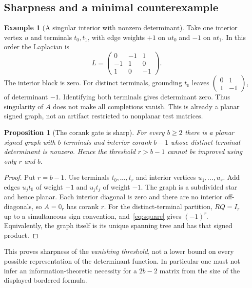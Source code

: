 \documentclass[11pt]{article}
\newtheorem{proposition}[theorem]{Proposition}
\theoremstyle{definition}
\newtheorem{example}[theorem]{Example}
\theoremstyle{remark}
\begin{document}
\subsection{Sharpness and a minimal counterexample}
\begin{example}[A singular interior with nonzero determinant]\label{ex:singular}
Take one interior vertex $u$ and terminals $t_0,t_1$, with edge weights $+1$
on $ut_0$ and $-1$ on $ut_1$. In this order the Laplacian is
\[
 L=\begin{pmatrix}0&-1&1\\-1&1&0\\1&0&-1\end{pmatrix}.
\]
The interior block is zero. For distinct terminals, grounding $t_0$ leaves
$\left(\begin{smallmatrix}0&1\\1&-1\end{smallmatrix}\right)$, of determinant
$-1$. Identifying both terminals gives determinant zero. Thus singularity of
$A$ does not make all completions vanish. This is already a planar signed
graph, not an artifact restricted to nonplanar test matrices.
\end{example}

\begin{proposition}[The corank gate is sharp]\label{prop:sharp}
For every $b\ge2$ there is a planar signed graph with $b$ terminals and
interior corank $b-1$ whose distinct-terminal determinant is nonzero.
Hence the threshold $r>b-1$ cannot be improved using only $r$ and $b$.
\end{proposition}
\begin{proof}
Put $r=b-1$. Use terminals $t_0,\ldots,t_r$ and interior vertices
$u_1,\ldots,u_r$. Add edges $u_jt_0$ of weight $+1$ and $u_jt_j$ of weight
$-1$. The graph is a subdivided star and hence planar. Each interior diagonal
is zero and there are no interior off-diagonals, so $A=0_r$ has corank $r$.
For the distinct-terminal partition, $RQ=I_r$ up to a simultaneous sign
convention, and~\eqref{eq:square} gives $(-1)^r$. Equivalently, the graph
itself is its unique spanning tree and has that signed product.
\end{proof}

This proves sharpness of the \emph{vanishing threshold}, not a lower bound
on every possible representation of the determinant function. In particular
one must not infer an information-theoretic necessity for a $2b-2$ matrix
from the size of the displayed bordered formula.
\end{document}
